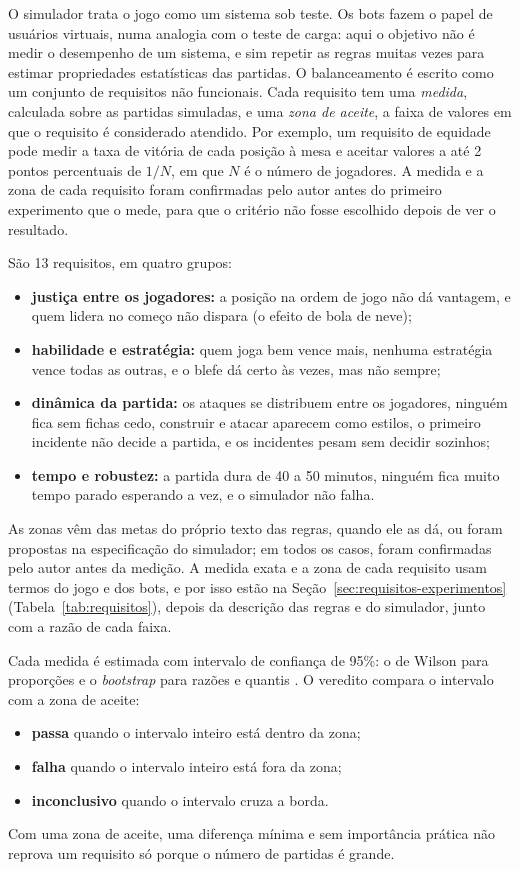 O simulador trata o jogo como um sistema sob teste. Os bots fazem o papel de usuários virtuais, numa
analogia com o teste de carga: aqui o objetivo não é medir o desempenho de um sistema, e sim repetir as regras
muitas vezes para estimar propriedades estatísticas das partidas. O balanceamento é escrito como um conjunto
de requisitos não funcionais. Cada requisito tem uma
\emph{medida}, calculada sobre as partidas simuladas, e uma \emph{zona de aceite}, a faixa de valores em que o
requisito é considerado atendido. Por exemplo, um requisito de equidade pode medir a taxa de vitória de cada
posição à mesa e aceitar valores a até 2 pontos percentuais de $1/N$, em que $N$ é o número de jogadores. A
medida e a zona de cada requisito foram confirmadas pelo autor antes do primeiro experimento que o mede, para que
o critério não fosse escolhido depois de ver o resultado.

São 13 requisitos, em quatro grupos:
\begin{itemize}
  \item \textbf{justiça entre os jogadores:} a posição na ordem de jogo não dá vantagem, e quem lidera no começo
    não dispara (o efeito de bola de neve);
  \item \textbf{habilidade e estratégia:} quem joga bem vence mais, nenhuma estratégia vence todas as outras, e
    o blefe dá certo às vezes, mas não sempre;
  \item \textbf{dinâmica da partida:} os ataques se distribuem entre os jogadores, ninguém fica sem fichas cedo,
    construir e atacar aparecem como estilos, o primeiro incidente não decide a partida, e os incidentes pesam
    sem decidir sozinhos;
  \item \textbf{tempo e robustez:} a partida dura de 40 a 50 minutos, ninguém fica muito tempo parado esperando
    a vez, e o simulador não falha.
\end{itemize}
As zonas vêm das metas do próprio texto das regras, quando ele as dá, ou foram propostas na especificação do
simulador; em todos os casos, foram confirmadas pelo autor antes da medição. A medida exata e a zona de cada
requisito usam termos do jogo e dos bots, e por isso estão na Seção~\ref{sec:requisitos-experimentos}
(Tabela~\ref{tab:requisitos}), depois da descrição das regras e do simulador, junto com a razão de cada faixa.

Cada medida é estimada com intervalo de confiança de 95\%: o de Wilson para proporções \cite{wilson1927} e o
\emph{bootstrap} para razões e quantis \cite{efron1993}. O veredito compara o intervalo com a zona de aceite:
\begin{itemize}
  \item \textbf{passa} quando o intervalo inteiro está dentro da zona;
  \item \textbf{falha} quando o intervalo inteiro está fora da zona;
  \item \textbf{inconclusivo} quando o intervalo cruza a borda.
\end{itemize}
Com uma zona de aceite, uma diferença mínima e sem importância prática não reprova um requisito só porque o
número de partidas é grande.

